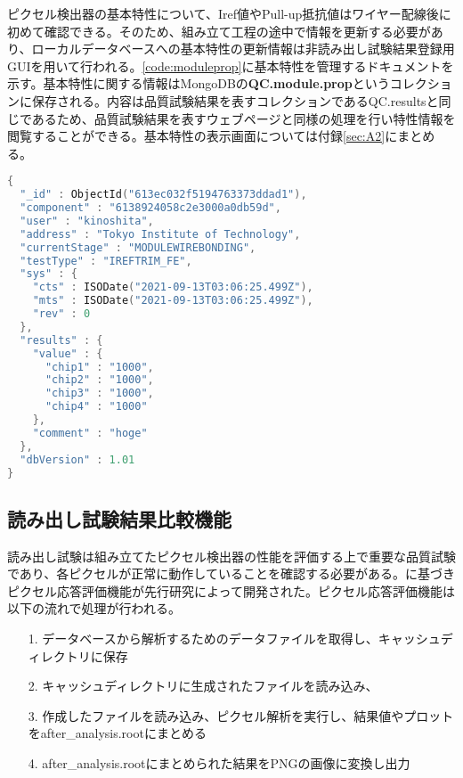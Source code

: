 ピクセル検出器の基本特性について、Iref値やPull-up抵抗値はワイヤー配線後に初めて確認できる。そのため、組み立て工程の途中で情報を更新する必要があり、ローカルデータベースへの基本特性の更新情報は非読み出し試験結果登録用GUIを用いて行われる。\cref{code:moduleprop}に基本特性を管理するドキュメントを示す。基本特性に関する情報はMongoDBの\textbf{QC.module.prop}というコレクションに保存される。内容は品質試験結果を表すコレクションであるQC.resultsと同じであるため、品質試験結果を表すウェブページと同様の処理を行い特性情報を閲覧することができる。基本特性の表示画面については付録\ref{sec:A2}にまとめる。

\begin{lstlisting}[caption=ピクセル検出器の基本特定更新情報を表すドキュメント。,label=code:moduleprop, language=C++]
{
  "_id" : ObjectId("613ec032f5194763373ddad1"),
  "component" : "6138924058c2e3000a0db59d",
  "user" : "kinoshita",
  "address" : "Tokyo Institute of Technology",
  "currentStage" : "MODULEWIREBONDING",
  "testType" : "IREFTRIM_FE",
  "sys" : {
    "cts" : ISODate("2021-09-13T03:06:25.499Z"),
    "mts" : ISODate("2021-09-13T03:06:25.499Z"),
    "rev" : 0
  },
  "results" : {
    "value" : {
      "chip1" : "1000",
      "chip2" : "1000",
      "chip3" : "1000",
      "chip4" : "1000"
    },
    "comment" : "hoge"
  },
  "dbVersion" : 1.01
}
\end{lstlisting}

\subsection{読み出し試験結果比較機能}
\label{sec:elec-hikaku}

読み出し試験は組み立てたピクセル検出器の性能を評価する上で重要な品質試験であり、各ピクセルが正常に動作していることを確認する必要がある。に基づきピクセル応答評価機能が先行研究\cite{oku}によって開発された。ピクセル応答評価機能は以下の流れで処理が行われる。
\begin{itemize}
  \item[1. ] データベースから解析するためのデータファイルを取得し、キャッシュディレクトリに保存
  \item[2. ] キャッシュディレクトリに生成されたファイルを読み込み、
  \item[3. ] 作成したファイルを読み込み、ピクセル解析を実行し、結果値やプロットをafter\_analysis.rootにまとめる
  \item[4. ] after\_analysis.rootにまとめられた結果をPNGの画像に変換し出力
\end{itemize}

